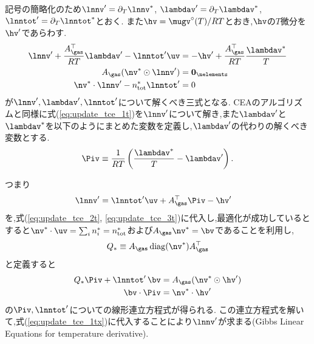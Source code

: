 記号の簡略化のため$\lnnv^\prime = \partial_{T} {\lnnv}^\ast$, $\lambdav^\prime=\partial_{T} {\lambdav}^\ast$, $\lnntot^\prime=\partial_{T} \lnntot^\ast$とおく. また$\hv = \mugv^\circ (T)/RT$とおき,$\hv$の$T$微分を$\hv^\prime$であらわす. 
\begin{align}
\label{eq:update_tce_1t}
    \lnnv^\prime + \frac{A_\gas^\top }{RT} \lambdav^\prime - \lnntot^\prime \uv &= - \hv^\prime + \dfrac{A_\gas^\top }{R T} \dfrac{\lambdav^\ast}{T}\\
\label{eq:update_tce_2t}
    A_\gas (\nv^\ast \odot \lnnv^\prime) &= \boldsymbol{0}_\nelements \\
\label{eq:update_tce_3t}
    \nv^\ast \cdot \lnnv^\prime  - n_\mathrm{tot}^\ast \lnntot^\prime &= 0
\end{align}
が$\lnnv^\prime, \lambdav^\prime, \lnntot^\prime$について解くべき三式となる. CEAのアルゴリズムと同様に式(\ref{eq:update_tce_1t})を$\lnnv^\prime$について解き,また$\lambdav^\prime$と$\lambdav^\ast$を以下のようにまとめた変数を定義し,$\lambdav^\prime$の代わりの解くべき変数とする. 
\begin{align}
    \Piv \equiv \dfrac{1}{R T} \left(\dfrac{\lambdav^\ast}{T} - \lambdav^\prime \right).
\end{align}

つまり
\begin{align}
\label{eq:update_tce_1tx}
    \lnnv^\prime &= \lnntot^\prime \uv + A_\gas^\top \Piv - \hv^\prime 
\end{align}
を,式(\ref{eq:update_tce_2t}, \ref{eq:update_tce_3t})に代入し,最適化が成功しているとすると$\nv^\ast \cdot \uv = \sum_i n_i^\ast = n_\mathrm{tot}^\ast$および$A_\gas \nv^\ast = \bv$であることを利用し,
\begin{align}
    Q_\ast &\equiv A_\gas \, \mathrm{diag}(\nv^\ast) A_\gas^\top \\
\end{align}
と定義すると
\begin{align}
\label{eq:update_tce_2tx}
    Q_\ast \Piv +  \lnntot^\prime \, \bv &= A_\gas (\nv^\ast \odot \hv^\prime) \\
\label{eq:update_tce_3tx}
    \bv \cdot \Piv &= \nv^\ast \cdot \hv^\prime
\end{align}
の$\Piv, \lnntot^\prime$についての線形連立方程式が得られる. この連立方程式を解いて,式(\ref{eq:update_tce_1tx})に代入することにより$\lnnv^\prime$が求まる(Gibbs Linear Equations for temperature derivative). 


